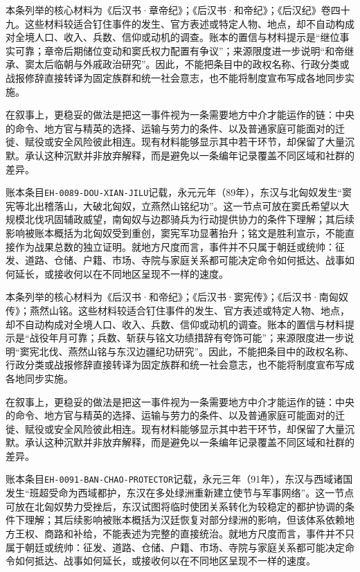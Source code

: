 本条列举的核心材料为《后汉书·章帝纪》；《后汉书·和帝纪》；《后汉纪》卷四十九。这些材料较适合钉住事件的发生、官方表述或特定人物、地点，却不自动构成对全境人口、收入、兵数、信仰或动机的调查。账本的置信与材料提示是“继位事实可靠；章帝后期储位变动和窦氏权力配置有争议”；来源限度进一步说明“和帝继承、窦太后临朝与外戚政治研究”。因此，不能把条目中的政权名称、行政分类或战报修辞直接转译为固定族群和统一社会意志，也不能将制度宣布写成各地同步实施。

在叙事上，更稳妥的做法是把这一事件视为一条需要地方中介才能运作的链：中央的命令、地方官与精英的选择、运输与劳力的条件、以及普通家庭可能面对的迁徙、赋役或安全风险彼此相连。现有材料能够显示其中若干环节，却保留了大量沉默。承认这种沉默并非放弃解释，而是避免以一条编年记录覆盖不同区域和社群的差异。

账本条目\texttt{EH-0089-DOU-XIAN-JILU}记载，永元元年（89年），东汉与北匈奴发生“窦宪等北出稽落山，大破北匈奴，立燕然山铭纪功”。这一节点可放在窦氏希望以大规模北伐巩固辅政威望，南匈奴与边郡骑兵为行动提供协力的条件下理解；其后续影响被账本概括为北匈奴受到重创，窦宪军功显著抬升；铭文是胜利宣示，不能直接作为战果总数的独立证明。就地方尺度而言，事件并不只属于朝廷或统帅：征发、道路、仓储、户籍、市场、寺院与家庭关系都可能决定命令如何抵达、战事如何延长，或接收何以在不同地区呈现不一样的速度。

本条列举的核心材料为《后汉书·和帝纪》；《后汉书·窦宪传》；《后汉书·南匈奴传》；燕然山铭。这些材料较适合钉住事件的发生、官方表述或特定人物、地点，却不自动构成对全境人口、收入、兵数、信仰或动机的调查。账本的置信与材料提示是“战役年月可靠；兵数、斩获与铭文功绩措辞有夸饰可能”；来源限度进一步说明“窦宪北伐、燕然山铭与东汉边疆纪功研究”。因此，不能把条目中的政权名称、行政分类或战报修辞直接转译为固定族群和统一社会意志，也不能将制度宣布写成各地同步实施。

在叙事上，更稳妥的做法是把这一事件视为一条需要地方中介才能运作的链：中央的命令、地方官与精英的选择、运输与劳力的条件、以及普通家庭可能面对的迁徙、赋役或安全风险彼此相连。现有材料能够显示其中若干环节，却保留了大量沉默。承认这种沉默并非放弃解释，而是避免以一条编年记录覆盖不同区域和社群的差异。

账本条目\texttt{EH-0091-BAN-CHAO-PROTECTOR}记载，永元三年（91年），东汉与西域诸国发生“班超受命为西域都护，东汉在多处绿洲重新建立使节与军事网络”。这一节点可放在北匈奴势力受挫后，东汉试图将临时使团关系转化为较稳定的都护协调的条件下理解；其后续影响被账本概括为汉廷恢复对部分绿洲的影响，但该体系依赖地方王权、商路和补给，不能表述为完整的直接统治。就地方尺度而言，事件并不只属于朝廷或统帅：征发、道路、仓储、户籍、市场、寺院与家庭关系都可能决定命令如何抵达、战事如何延长，或接收何以在不同地区呈现不一样的速度。

